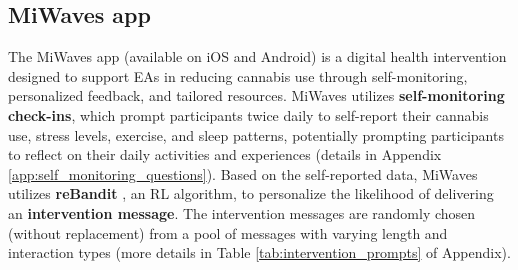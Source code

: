 \subsection{MiWaves app}
\label{sec:miwaves_app}
The MiWaves app (available on iOS and Android) is a digital health intervention designed to support EAs in reducing cannabis use through self-monitoring, personalized feedback, and tailored resources. 
MiWaves utilizes \textbf{self-monitoring check-ins}, which prompt participants twice daily to self-report their cannabis use, stress levels, exercise, and sleep patterns, potentially prompting participants to reflect on their daily activities and experiences 
(details in Appendix \ref{app:self_monitoring_questions}). Based on the self-reported data, MiWaves utilizes \textbf{reBandit} \cite{ghoshmiwaves2024}, an RL algorithm, to personalize the likelihood of delivering an \textbf{intervention message}.
The intervention messages are randomly chosen (without replacement) from a pool of messages with varying length and interaction types (more details in Table \ref{tab:intervention_prompts} of Appendix).
